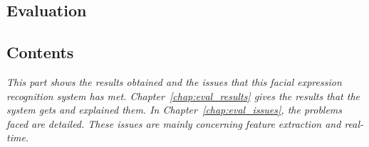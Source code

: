   \begin{titlepage}
    \vspace*{\fill}
      \part{Evaluation}
    \vspace*{\fill}
  \end{titlepage}

\startcontents[parts]
  
\chapter*{Contents}

\textit{This part shows the results obtained and the issues that this facial expression recognition system has met. Chapter~\ref{chap:eval_results} gives the results that the system gets and explained them. In Chapter~\ref{chap:eval_issues}, the problems faced are detailed. These issues are mainly concerning \textit{feature extraction} and \textit{real-time}.}

\vspace{\baselineskip}


\pagebreak


\newpage

\newpage


\stopcontents[parts]